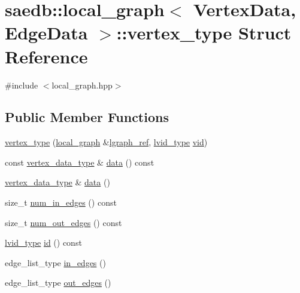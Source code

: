 \hypertarget{structsaedb_1_1local__graph_1_1vertex__type}{\section{saedb\-:\-:local\-\_\-graph$<$ Vertex\-Data, Edge\-Data $>$\-:\-:vertex\-\_\-type Struct Reference}
\label{dd/d9a/structsaedb_1_1local__graph_1_1vertex__type}
}


{\ttfamily \#include $<$local\-\_\-graph.\-hpp$>$}

\subsection*{Public Member Functions}
\begin{DoxyCompactItemize}
\item 
\hyperlink{structsaedb_1_1local__graph_1_1vertex__type_af6dc2c1d477f81b2582a11cf9eec1dde}{vertex\-\_\-type} (\hyperlink{classsaedb_1_1local__graph}{local\-\_\-graph} \&\hyperlink{structsaedb_1_1local__graph_1_1vertex__type_a67948a82fbbd84618e77e73c44775527}{lgraph\-\_\-ref}, \hyperlink{namespacesaedb_ae0f2df508bdfd29505d57534c8ed4a65}{lvid\-\_\-type} \hyperlink{structsaedb_1_1local__graph_1_1vertex__type_adcff5336560c8bc3bafc2a3a0deb0518}{vid})
\item 
const \hyperlink{classsaedb_1_1local__graph_a844bd7c9e27012270a4d6499ff830360}{vertex\-\_\-data\-\_\-type} \& \hyperlink{structsaedb_1_1local__graph_1_1vertex__type_a985dd4c5b7d204921a86c4d77ad9a3fd}{data} () const 
\item 
\hyperlink{classsaedb_1_1local__graph_a844bd7c9e27012270a4d6499ff830360}{vertex\-\_\-data\-\_\-type} \& \hyperlink{structsaedb_1_1local__graph_1_1vertex__type_a4cad1bf0109a5ae5d9228ea6988bba1d}{data} ()
\item 
size\-\_\-t \hyperlink{structsaedb_1_1local__graph_1_1vertex__type_a31ba0b56f07c805b4b315709385160f1}{num\-\_\-in\-\_\-edges} () const 
\item 
size\-\_\-t \hyperlink{structsaedb_1_1local__graph_1_1vertex__type_a8c600b26d48d6a0fd958ce6911ae57e4}{num\-\_\-out\-\_\-edges} () const 
\item 
\hyperlink{namespacesaedb_ae0f2df508bdfd29505d57534c8ed4a65}{lvid\-\_\-type} \hyperlink{structsaedb_1_1local__graph_1_1vertex__type_a3ca972e4f32f004ddf546f5852f22c19}{id} () const 
\item 
edge\-\_\-list\-\_\-type \hyperlink{structsaedb_1_1local__graph_1_1vertex__type_ae5d2a224c06f6a7683f1e5ad6d0e984c}{in\-\_\-edges} ()
\item 
edge\-\_\-list\-\_\-type \hyperlink{structsaedb_1_1local__graph_1_1vertex__type_a0712510cea285500e449e9495e465c30}{out\-\_\-edges} ()
\end{DoxyCompactItemize}
